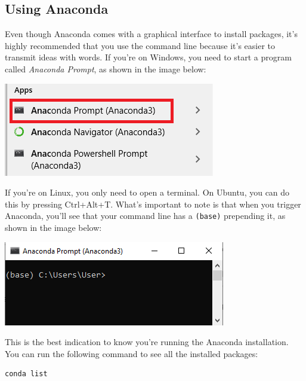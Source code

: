 \pagebreak[3]

\subsection{Using Anaconda}\label{subsec:using-anaconda}
Even though Anaconda comes with a graphical interface to install packages, it's highly recommended that you use the command line because it's easier to transmit ideas with words. If you're on Windows, you need to start a program called \emph{Anaconda Prompt}, as shown in the image below:

\begin{center}
\includegraphics[width=.5\textwidth]{images/Chapter_02/AnacondaPrompt_Menu.png}
\end{center}

If you're on Linux, you only need to open a terminal. On Ubuntu, you can do this by pressing Ctrl+Alt+T. What's important to note is that when you trigger Anaconda, you'll see that your command line has a \texttt{(base)} prepending it, as shown in the image below:

\begin{center}
\includegraphics[width=.5\textwidth]{images/Chapter_02/AnacondaPrompt.png}
\end{center}

This is the best indication to know you're running the Anaconda installation. You can run the following command to see all the installed packages:

\begin{verbatim}
conda list
\end{verbatim}

